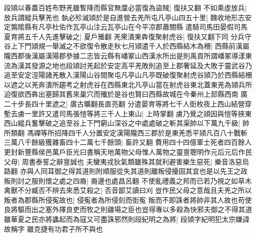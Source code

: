 段熲以春農百姓布野羌雖暫降而縣官無廩必當復為盜賊|{
	復扶又翻}
不如乘虛放兵|{
	放兵謂縱兵擊羌也}
埶必殄滅熲於是自進營去羌所屯凡亭山四五十里|{
	魏收地形志安定鶉隂縣有凡亭杜佑作瓦亭山注云瓦亭山在今平凉郡蕭關縣}
遣騎司馬田晏假司馬夏育將五千人先進擊破之|{
	夏戶雅翻}
羌衆潰東犇復聚射虎谷|{
	復扶又翻下同}
分兵守谷上下門熲規一舉滅之不欲復令散走秋七月熲遣千人於西縣結木為柵|{
	西縣前漢屬隴西郡後漢屬漢陽郡參據二志皆云縣有嶓冢山西漢水所出是則禹貢所謂嶓冢導漾東流為漢其發源之地也段熲討羌起於安定高平羌敗則追至上郡奢延及大敗于靈武谷乃追至安定涇陽諸羌散入漢陽山谷間聚屯凡亭山凡亭既破復聚射虎谷熲乃於西縣結柵以遮之以羌奔潰所趨考之射虎谷在西縣東北凡亭山當在射虎谷東北蓋東羌為熲兵所迫復欲西犇出塞歸其舊來巢穴而殱於是谷也賢曰西縣故城在今秦州上邽縣西南}
廣二十步長四十里遮之|{
	廣古曠翻長直亮翻}
分遣晏育等將七千人衘枚夜上西山結營穿塹去虜一里許又遣司馬張愷等將三千人上東山|{
	上時掌翻}
虜乃覺之熲因與愷等挾東西山縱兵奮擊破之追至谷上下門窮山深谷之中處處破之斬其渠帥以下萬九千級|{
	帥所類翻}
馮禪等所招降四千人分置安定漢陽隴西三郡於是東羌悉平熲凡百八十戰斬三萬八千餘級獲雜畜四十二萬七千餘頭|{
	畜許又翻}
費用四十四億軍士死者四百餘人更封新豐縣侯邑萬戶臣光曰書稱天地萬物父母惟人萬物之靈亶聰明作元后元后作民父母|{
	周書泰誓之辭亶誠也}
夫蠻夷戎狄氣類雖殊其就利避害樂生惡死|{
	樂音洛惡烏路翻}
亦與人同耳御之得其道則附順服從失其道則離叛侵擾固其宜也是以先王之政叛則討之服則懷之處之四裔|{
	裔邊也處昌呂翻}
不使亂禮義之邦而已若乃視之如草木禽獸不分臧否不辨去來悉艾殺之|{
	否音鄙艾讀曰刈}
豈作民父母之意哉且夫羌之所以叛者為郡縣所侵寃故也|{
	侵寃者為所侵刻而衘寃}
叛而不即誅者將帥非其人故也苟使良將驅而出之塞外擇良吏而牧之則疆場之臣也豈得專以多殺為快邪夫御之不得其道雖華夏之民亦將蠭起而為寇又可盡誅邪然則段紀明之為將|{
	段熲字紀明犯太宗嫌諱故稱字}
雖克捷有功君子所不與也

